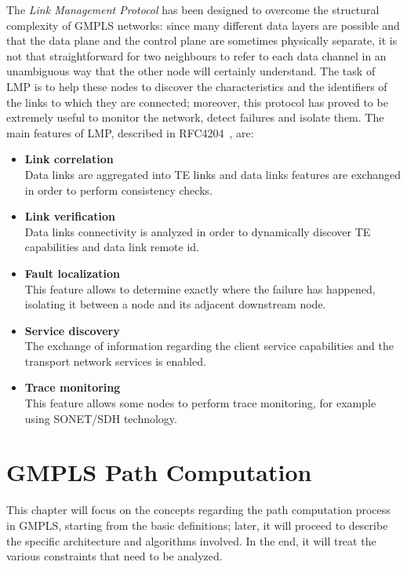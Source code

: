 \documentclass[10pt,a4paper]{report}
\begin{document}
The \textit{Link Management Protocol} has been designed to overcome
the structural complexity of GMPLS networks: since many different data
layers are possible and that the data plane and the control plane are
sometimes physically separate, it is not that straightforward for two
neighbours to refer to each data channel in an unambiguous way that
the other node will certainly understand. The task of LMP is to help
these nodes to discover the characteristics and the identifiers of the
links to which they are connected; moreover, this protocol has proved
to be extremely useful to monitor the network, detect failures and
isolate them. The main features of LMP, described in
RFC4204~\cite{rfc4204}, are:
\begin{itemize}
\item \textbf{Link correlation} \\
  Data links are aggregated into TE links and data links features are
  exchanged in order to perform consistency checks.
\item \textbf{Link verification} \\
  Data links connectivity is analyzed in order to dynamically discover
  TE capabilities and data link remote id.
\item \textbf{Fault localization} \\
  This feature allows to determine exactly where the failure has
  happened, isolating it between a node and its adjacent downstream
  node.
\item \textbf{Service discovery} \\
  The exchange of information regarding the client service
  capabilities and the transport network services is enabled.
\item \textbf{Trace monitoring} \\
  This feature allows some nodes to perform trace monitoring, for
  example using SONET/SDH technology.
\end{itemize}

\chapter{GMPLS Path Computation}\label{sec:gmplspath}

This chapter will focus on the concepts regarding the path computation
process in GMPLS, starting from the basic definitions; later, it will
proceed to describe the specific architecture and algorithms
involved. In the end, it will treat the various constraints that need
to be analyzed.
\end{document}
